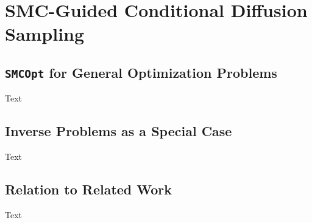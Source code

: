 \chapter{SMC-Guided Conditional Diffusion Sampling}

\section{\texttt{SMCOpt} for General Optimization Problems}

Text

\section{Inverse Problems as a Special Case}

Text

\section{Relation to Related Work} \label{sec:relation-to-related}

Text
